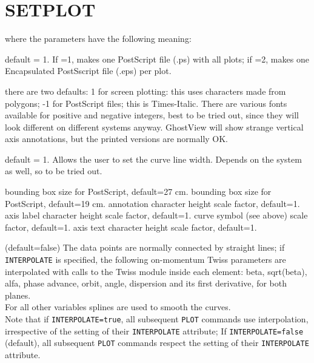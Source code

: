 \section{SETPLOT}
\label{sec:setplot}

where the parameters have the following meaning: 
\begin{madlist}
    default = 1. If =1, makes one PostScript file (.ps) with
     all plots; if =2, makes one Encapsulated PostSscript file (.eps)
     per plot.   

    there are two defaults: 1 for screen plotting: this uses
     characters made from polygons; -1 for PostScript files; this is
     Times-Italic. There are various fonts available for positive and
     negative integers, best to be tried out, since they will look
     different on different systems anyway. GhostView will show strange
     vertical axis annotations, but the printed versions are normally
     OK.   

    default = 1. Allows the user to set the curve line
     width.  Depends on the system as well, so to be tried out.   

    bounding box size for PostScript, default=27 cm.   
    bounding box size for PostScript, default=19 cm.   
    annotation character height scale factor, default=1.   
    axis label character height scale factor, default=1.  
    curve symbol (see above) scale factor, default=1.  
    axis text character height scale factor, default=1.  

    (default=false) The data points are
     normally connected by straight lines; if {\tt INTERPOLATE} is
     specified, the following on-momentum Twiss parameters are
     interpolated with calls to the Twiss module inside 
     each element:  beta, sqrt(beta), alfa, phase advance, orbit, angle,
     dispersion and its first derivative, for both planes. \\ 
     For all other variables splines are used to smooth the curves. \\  
     Note that if {\tt INTERPOLATE=true}, all subsequent {\tt PLOT} 
     commands use interpolation, irrespective of the setting of their 
     {\tt INTERPOLATE} attribute; 
     If {\tt INTERPOLATE=false} (default), all subsequent {\tt PLOT} 
     commands respect the setting of their {\tt INTERPOLATE} attribute.
\end{madlist}


